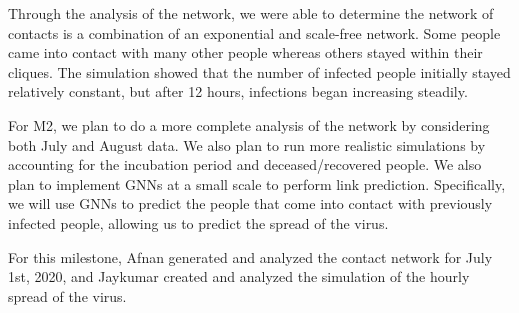 \documentclass[times, 10pt,twocolumn]{article}
\begin{document}
Through the analysis of the network, we were able to determine the network of contacts is a combination of an exponential and scale-free network. Some people came into contact with many other people whereas others stayed within their cliques. The simulation showed that the number of infected people initially stayed relatively constant, but after 12 hours, infections began increasing steadily.

For M2, we plan to do a more complete analysis of the network by considering both July and August data. We also plan to run more realistic simulations by accounting for the incubation period and deceased/recovered people. We also plan to implement GNNs at a small scale to perform link prediction. Specifically, we will use GNNs to predict the people that come into contact with previously infected people, allowing us to predict the spread of the virus.


For this milestone, Afnan generated and analyzed the contact network for July 1st, 2020, and Jaykumar created and analyzed the simulation of the hourly spread of the virus.





\end{document}
